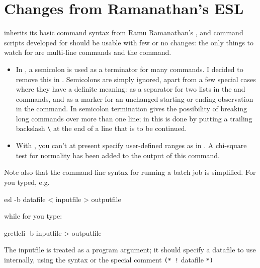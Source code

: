 \section{Changes from Ramanathan's ESL}
\label{cli-syntax}

 inherits its basic command syntax from Ramu
Ramanathan's , and command scripts developed for 
should be usable with few or no changes: the only things to watch for
are multi-line commands and the  command.
    
\begin{itemize}
\item In , a semicolon is used as a terminator for many
  commands.  I decided to remove this in . Semicolons
  are simply ignored, apart from a few special cases where they have a
  definite meaning: as a separator for two lists in the  and
   commands, and as a marker for an unchanged starting or
  ending observation in the  command. In  semicolon
  termination gives the possibility of breaking long commands over
  more than one line; in  this is done by putting a
  trailing backslash \verb+\+ at the end of a line that is to be
  continued.
\item With , you can't at present specify user-defined
  ranges as in .  A chi-square test for normality has been
  added to the output of this command.
\end{itemize}

Note also that the command-line syntax for running a batch job is
simplified. For  you typed, e.g.
      
\begin{code} 
    esl -b datafile < inputfile > outputfile
\end{code}
%
while for  you type:
%      
\begin{code}
    gretlcli -b inputfile > outputfile
\end{code}

The inputfile is treated as a program argument; it should specify a
datafile to use internally, using the syntax  or
the special comment \verb+(* !+ datafile \verb+*)+
    


